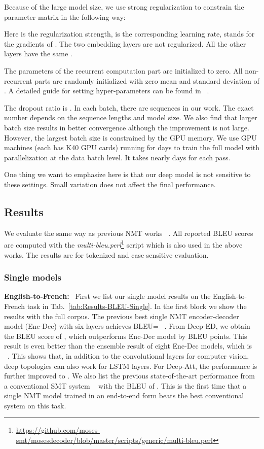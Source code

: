 \documentclass[11pt,letterpaper]{article}
\begin{document}
Because of the large model size, we use strong  regularization to constrain the parameter matrix  in the following way:

Here  is the regularization strength,  is the corresponding learning rate,  stands for the gradients of . The two embedding layers
are not regularized. All the other layers have the same  .

The parameters of the recurrent computation part are initialized to zero. All non-recurrent parts are randomly initialized with zero mean and
standard deviation of . A detailed guide for setting hyper-parameters can be found in ~\cite{Bengio-ARXIV2012}.

The dropout ratio  is  . In each batch, there are  sequences in our work. The exact number depends on the sequence
lengths and model size.  We also find that larger batch size results in better convergence although the improvement is not large. However, the
largest batch size is constrained  by the GPU memory. We use  GPU machines (each has  K40 GPU cards) running for  days to train
the full model with parallelization at the data batch level. It takes nearly  days for each pass.

One thing we want to emphasize here is that our deep model is not sensitive to these settings. Small variation does not affect the final
performance.

\subsection{Results}

We evaluate the same way as previous NMT works ~\cite{Sutskever-Le-NIPS2014,Luong-Zaremba-ACL2015,Jean-Bengio-ACL2015}. All reported BLEU
\mbox{scores} are computed with the
\emph{multi-bleu.perl}\footnote{\url{https://github.com/moses-smt/mosesdecoder/blob/master/scripts/generic/multi-bleu.perl}} script which is
also used in the above works. The results are for tokenized and case sensitive evaluation.

\subsubsection{Single models}



\noindent\textbf{English-to-French:} ~First we list our single model results on the English-to-French task in
Tab.~\ref{tab:Results-BLEU-Single}. In the first block we show the results with the \mbox{full} corpus. The previous best single NMT
encoder-decoder model (Enc-Dec) with six layers achieves BLEU= ~\cite{Luong-Zaremba-ACL2015}. From Deep-ED, we obtain the BLEU score of
, which outperforms Enc-Dec model by  BLEU points. This result is even better than the ensemble result of eight Enc-Dec models,
which is  ~\cite{Luong-Zaremba-ACL2015}. This shows that, in addition to the convolutional layers for computer vision, deep topologies
can also work for LSTM layers. For Deep-Att, the performance is further improved to  . We also list the previous state-of-the-art
performance from a conventional SMT system ~\cite{Durrani-Heafield-WMT2014} with the BLEU of . This is the first time that a single NMT
model trained in an end-to-end form beats the best \mbox{conventional} system on this task.
\end{document}
